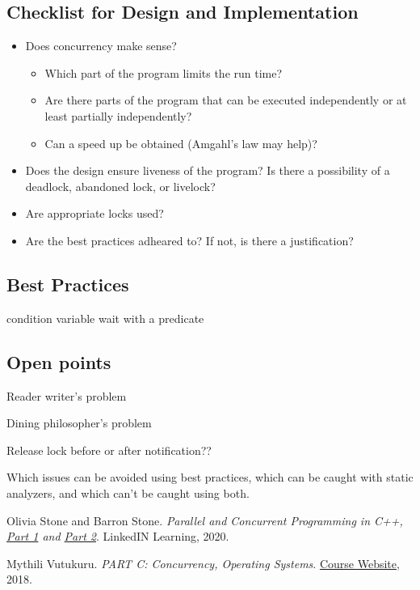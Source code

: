 \documentclass{scrartcl}
\begin{document}
\subsection{Checklist for Design and Implementation}
\begin{itemize}
    \item Does concurrency make sense?
    \begin{itemize}
        \item Which part of the program limits the run time?
        \item Are there parts of the program that can be executed independently or at least partially independently?
        \item Can a speed up be obtained (Amgahl's law may help)?
    \end{itemize}
    \item Does the design ensure liveness of the program? Is there a possibility of a deadlock, abandoned lock, or livelock?
    \item Are appropriate locks used? 
    \item Are the best practices adheared to? If not, is there a justification?
\end{itemize}


\subsection{Best Practices}

condition variable wait with a predicate

\subsection{Open points}
Reader writer's problem

Dining philosopher's problem

Release lock before or after notification??

Which issues can be avoided using best practices, which can be caught with static analyzers, and which can't be caught using both.

\begin{thebibliography}{9}

Olivia Stone and Barron Stone. 
\textit{Parallel and Concurrent Programming in C++, 
\href{https://www.linkedin.com/learning/parallel-and-concurrent-programming-with-c-plus-plus-part-1}{Part 1} and \href{https://www.linkedin.com/learning/parallel-and-concurrent-programming-with-c-plus-plus-part-2}{Part 2}}. LinkedIN Learning, 2020.

Mythili Vutukuru. 
\textit{PART C: Concurrency, Operating Systems}. 
\href{https://www.cse.iitb.ac.in/~mythili/os/}{Course Website}, 2018.






\end{thebibliography}
\end{document}
